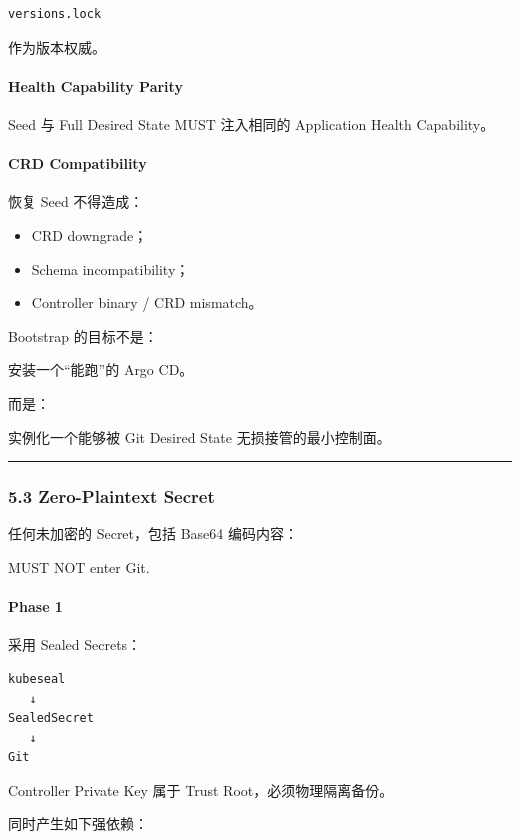 \documentclass[11pt,a4paper]{article}
\begin{document}
\begin{lstlisting}[language=text]
versions.lock
\end{lstlisting}
作为版本权威。

\paragraph{Health Capability Parity}
Seed 与 Full Desired State MUST 注入相同的 Application Health Capability。

\paragraph{CRD Compatibility}
恢复 Seed 不得造成：

\begin{itemize}
  \item CRD downgrade；
  \item Schema incompatibility；
  \item Controller binary / CRD mismatch。
\end{itemize}
Bootstrap 的目标不是：

\begin{gfmBlockquote}
安装一个“能跑”的 Argo CD。
\end{gfmBlockquote}
而是：

\begin{gfmBlockquote}
实例化一个能够被 Git Desired State 无损接管的最小控制面。
\end{gfmBlockquote}
\vspace{0.5em}\hrule\vspace{0.5em}
\subsubsection{5.3 Zero-Plaintext Secret}
任何未加密的 Secret，包括 Base64 编码内容：

\begin{gfmBlockquote}
MUST NOT enter Git.
\end{gfmBlockquote}
\paragraph{Phase 1}
采用 Sealed Secrets：

\begin{lstlisting}[language=text]
kubeseal
   ↓
SealedSecret
   ↓
Git
\end{lstlisting}
Controller Private Key 属于 Trust Root，必须物理隔离备份。

同时产生如下强依赖：
\end{document}
